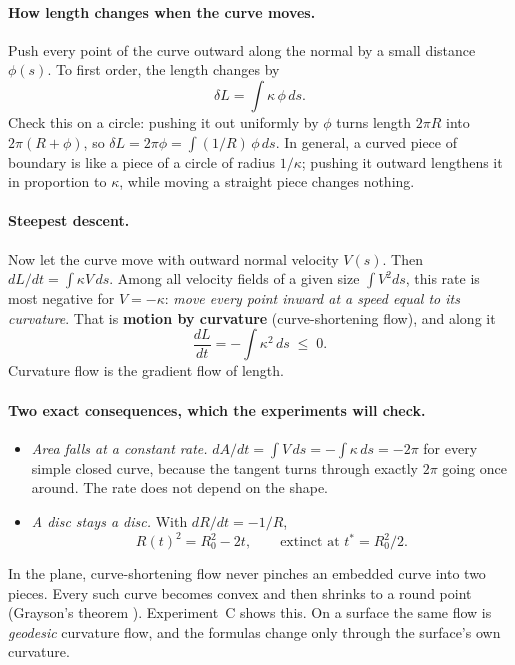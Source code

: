 \paragraph{How length changes when the curve moves.}
Push every point of the curve outward along the normal by a small distance
$\phi(s)$. To first order, the length changes by
\begin{equation}
  \delta L = \int \kappa\, \phi \, ds.
  \label{eq:ch1-first-variation}
\end{equation}
Check this on a circle: pushing it out uniformly by $\phi$ turns length $2\pi R$
into $2\pi(R + \phi)$, so $\delta L = 2\pi\phi = \int (1/R)\,\phi\, ds$. In
general, a curved piece of boundary is like a piece of a circle of radius
$1/\kappa$; pushing it outward lengthens it in proportion to $\kappa$, while
moving a straight piece changes nothing.

\paragraph{Steepest descent.}
Now let the curve move with outward normal velocity $V(s)$. Then
$dL/dt = \int \kappa V\, ds$. Among all velocity fields of a given size
$\int V^2 ds$, this rate is most negative for $V = -\kappa$: \emph{move every
point inward at a speed equal to its curvature}. That is \textbf{motion by
curvature} (curve-shortening flow), and along it
\begin{equation}
  \frac{dL}{dt} = -\int \kappa^2\, ds \;\le\; 0 .
  \label{eq:ch1-dLdt}
\end{equation}
Curvature flow is the gradient flow of length.

\paragraph{Two exact consequences, which the experiments will check.}
\begin{itemize}[nosep]
  \item \emph{Area falls at a constant rate.} $dA/dt = \int V\, ds =
        -\int \kappa\, ds = -2\pi$ for every simple closed curve, because the
        tangent turns through exactly $2\pi$ going once around. The rate does
        not depend on the shape.
  \item \emph{A disc stays a disc.} With $dR/dt = -1/R$,
        \begin{equation}
          R(t)^2 = R_0^2 - 2t, \qquad \text{extinct at } t^\ast = R_0^2/2 .
          \label{eq:ch1-disc}
        \end{equation}
\end{itemize}
In the plane, curve-shortening flow never pinches an embedded curve into two
pieces. Every such curve becomes convex and then shrinks to a round point
(Grayson's theorem \cite{grayson1987heat}). Experiment~C shows this. On a
surface the same flow is \emph{geodesic} curvature flow, and the formulas
change only through the surface's own curvature.

